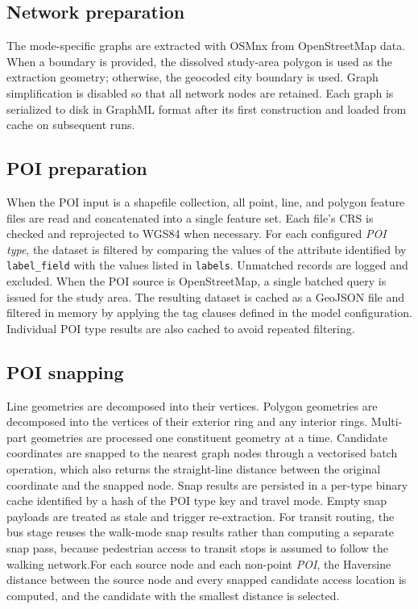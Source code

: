 \documentclass{article}
\begin{document}
\subsection{Network preparation}
The mode-specific graphs are extracted with OSMnx from OpenStreetMap data. When a boundary is provided, the dissolved study-area polygon is used as the extraction geometry; otherwise, the geocoded city boundary is used. Graph simplification is disabled so that all network nodes are retained. Each graph is serialized to disk in GraphML format after its first construction and loaded from cache on subsequent runs.

\subsection{POI preparation}
When the POI input is a shapefile collection, all point, line, and polygon feature files are read and concatenated into a single feature set. Each file's CRS is checked and reprojected to WGS84 when necessary. For each configured \emph{POI type}, the dataset is filtered by comparing the values of the attribute identified by \texttt{label\_field} with the values listed in \texttt{labels}. Unmatched records are logged and excluded. When the POI source is OpenStreetMap, a single batched query is issued for the study area. The resulting dataset is cached as a GeoJSON file and filtered in memory by applying the tag clauses defined in the model configuration. Individual POI type results are also cached to avoid repeated filtering.

\subsection{POI snapping}
Line geometries are decomposed into their vertices. Polygon geometries are decomposed into the vertices of their exterior ring and any interior rings. Multi-part geometries are processed one constituent geometry at a time. Candidate coordinates are snapped to the nearest graph nodes through a vectorised batch operation, which also returns the straight-line distance between the original coordinate and the snapped node. Snap results are persisted in a per-type binary cache identified by a hash of the POI type key and travel mode. Empty snap payloads are treated as stale and trigger re-extraction. For transit routing, the bus stage reuses the walk-mode snap results rather than computing a separate snap pass, because pedestrian access to transit stops is assumed to follow the walking network.For each source node and each non-point \emph{POI}, the Haversine distance between the source node and every snapped candidate access location is
computed, and the candidate with the smallest distance is selected.
\end{document}

